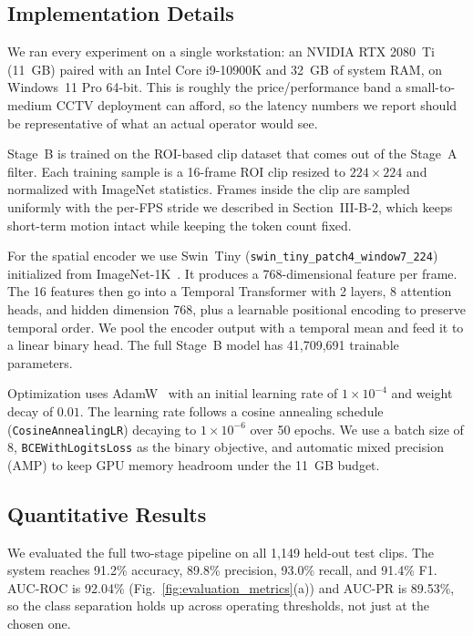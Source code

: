 \documentclass[conference]{IEEEtran}
\begin{document}
\subsection{Implementation Details}
We ran every experiment on a single workstation: an NVIDIA RTX 2080~Ti (11~GB) paired with an Intel Core i9-10900K and 32~GB of system RAM, on Windows~11 Pro 64-bit. This is roughly the price/performance band a small-to-medium CCTV deployment can afford, so the latency numbers we report should be representative of what an actual operator would see.

Stage~B is trained on the ROI-based clip dataset that comes out of the Stage~A filter. Each training sample is a 16-frame ROI clip resized to $224 \times 224$ and normalized with ImageNet statistics. Frames inside the clip are sampled uniformly with the per-FPS stride we described in Section~III-B-2, which keeps short-term motion intact while keeping the token count fixed.

For the spatial encoder we use Swin~Tiny (\texttt{swin\_tiny\_patch4\_window7\_224}) initialized from ImageNet-1K~\cite{deng_imagenet_2009, 9710580}. It produces a 768-dimensional feature per frame. The 16 features then go into a Temporal Transformer with 2 layers, 8 attention heads, and hidden dimension 768, plus a learnable positional encoding to preserve temporal order. We pool the encoder output with a temporal mean and feed it to a linear binary head. The full Stage~B model has 41,709,691 trainable parameters.

Optimization uses AdamW~\cite{loshchilov_adamw_2019} with an initial learning rate of $1\times10^{-4}$ and weight decay of $0.01$. The learning rate follows a cosine annealing schedule (\texttt{CosineAnnealingLR}) decaying to $1\times10^{-6}$ over 50 epochs. We use a batch size of 8, \texttt{BCEWithLogitsLoss} as the binary objective, and automatic mixed precision (AMP) to keep GPU memory headroom under the 11~GB budget.

\subsection{Quantitative Results}

We evaluated the full two-stage pipeline on all 1,149 held-out test clips. The system reaches 91.2\% accuracy, 89.8\% precision, 93.0\% recall, and 91.4\% F1. AUC-ROC is 92.04\% (Fig.~\ref{fig:evaluation_metrics}(a)) and AUC-PR is 89.53\%, so the class separation holds up across operating thresholds, not just at the chosen one.
\end{document}
